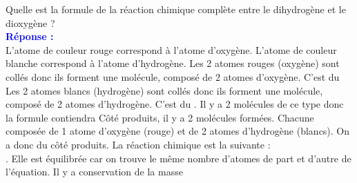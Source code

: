 \documentclass{exam}
\begin{document}
\begin{questions}

  \question[0.75] Quelle est la formule de la réaction chimique complète entre le dihydrogène et le dioxygène ? \\
  \textbf{\textcolor{blue}{Réponse :}} \\
  L'atome de couleur rouge correspond à l'atome d'oxygène. L'atome de couleur blanche correspond à l'atome d'hydrogène.
  Les 2 atomes rouges (oxygène) sont collés donc ils forment une molécule, composé de 2 atomes d'oxygène. C'est du 
  Les 2 atomes blancs (hydrogène) sont collés donc ils forment une molécule, composé de 2 atomes d'hydrogène. C'est du . Il y a 2 molécules de ce type donc la formule contiendra 
  Côté produits, il y a 2 molécules formées. Chacune composée de 1 atome d'oxygène (rouge) et de 2 atomes d'hydrogène (blancs). On a donc du  côté produits.
  La réaction chimique est la suivante : \\
  .
  Elle est équilibrée car on trouve le même nombre d'atomes de part et d'autre de l'équation. Il y a conservation de la masse
  
\end{questions}
\end{document}

